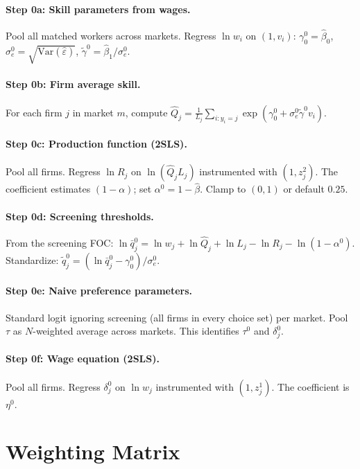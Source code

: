 \documentclass[11pt]{article}
\begin{document}
\paragraph{Step 0a: Skill parameters from wages.}
Pool all matched workers across markets. Regress $\ln w_i$ on $(1, v_i)$:
$\gamma_0^0 = \hat\beta_0$, $\sigma_e^0 = \sqrt{\text{Var}(\hat\varepsilon)}$,
$\tilde\gamma^0 = \hat\beta_1 / \sigma_e^0$.

\paragraph{Step 0b: Firm average skill.}
For each firm $j$ in market $m$, compute
$\hat Q_j = \frac{1}{L_j}\sum_{i: y_i = j} \exp(\gamma_0^0 + \sigma_e^0 \tilde\gamma^0 v_i)$.

\paragraph{Step 0c: Production function (2SLS).}
Pool all firms. Regress $\ln R_j$ on $\ln(\hat Q_j L_j)$ instrumented with $(1, z_j^2)$.
The coefficient estimates $(1-\alpha)$; set $\alpha^0 = 1 - \hat\beta$. Clamp to $(0,1)$ or default $0.25$.

\paragraph{Step 0d: Screening thresholds.}
From the screening FOC: $\ln\bar q_j^0 = \ln w_j + \ln \hat Q_j + \ln L_j - \ln R_j - \ln(1-\alpha^0)$.
Standardize: $\tilde q_j^0 = (\ln\bar q_j^0 - \gamma_0^0)/\sigma_e^0$.

\paragraph{Step 0e: Naive preference parameters.}
Standard logit ignoring screening (all firms in every choice set) per market.
Pool $\tau$ as $N$-weighted average across markets. This identifies $\tau^0$ and $\delta_j^0$.

\paragraph{Step 0f: Wage equation (2SLS).}
Pool all firms. Regress $\delta_j^0$ on $\ln w_j$ instrumented with $(1, z_j^1)$.
The coefficient is $\eta^0$.


\section{Weighting Matrix}\label{sec:weighting}
\end{document}

